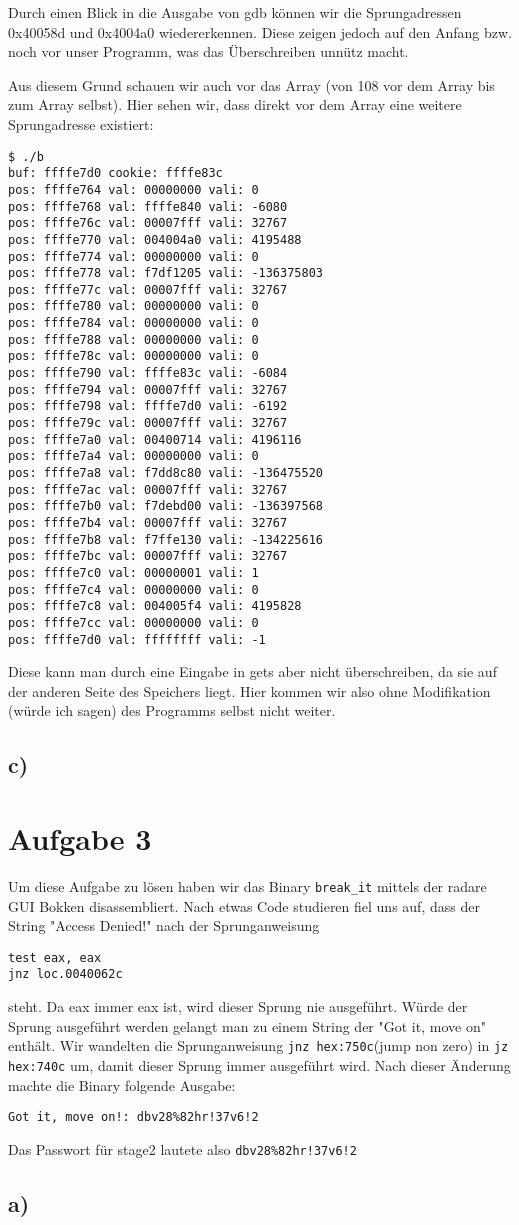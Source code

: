 \documentclass[10pt,a4paper]{article}
\begin{document}
Durch einen Blick in die Ausgabe von gdb können wir die Sprungadressen 0x40058d und 0x4004a0 wiedererkennen. Diese zeigen jedoch auf den Anfang bzw. noch vor unser Programm, was das Überschreiben unnütz macht.

Aus diesem Grund schauen wir auch vor das Array (von 108 vor dem Array bis zum Array selbst). Hier sehen wir, dass direkt vor dem Array eine weitere Sprungadresse existiert:
\begin{verbatim}
$ ./b
buf: ffffe7d0 cookie: ffffe83c
pos: ffffe764 val: 00000000 vali: 0
pos: ffffe768 val: ffffe840 vali: -6080
pos: ffffe76c val: 00007fff vali: 32767
pos: ffffe770 val: 004004a0 vali: 4195488
pos: ffffe774 val: 00000000 vali: 0
pos: ffffe778 val: f7df1205 vali: -136375803
pos: ffffe77c val: 00007fff vali: 32767
pos: ffffe780 val: 00000000 vali: 0
pos: ffffe784 val: 00000000 vali: 0
pos: ffffe788 val: 00000000 vali: 0
pos: ffffe78c val: 00000000 vali: 0
pos: ffffe790 val: ffffe83c vali: -6084
pos: ffffe794 val: 00007fff vali: 32767
pos: ffffe798 val: ffffe7d0 vali: -6192
pos: ffffe79c val: 00007fff vali: 32767
pos: ffffe7a0 val: 00400714 vali: 4196116
pos: ffffe7a4 val: 00000000 vali: 0
pos: ffffe7a8 val: f7dd8c80 vali: -136475520
pos: ffffe7ac val: 00007fff vali: 32767
pos: ffffe7b0 val: f7debd00 vali: -136397568
pos: ffffe7b4 val: 00007fff vali: 32767
pos: ffffe7b8 val: f7ffe130 vali: -134225616
pos: ffffe7bc val: 00007fff vali: 32767
pos: ffffe7c0 val: 00000001 vali: 1
pos: ffffe7c4 val: 00000000 vali: 0
pos: ffffe7c8 val: 004005f4 vali: 4195828
pos: ffffe7cc val: 00000000 vali: 0
pos: ffffe7d0 val: ffffffff vali: -1
\end{verbatim}
Diese kann man durch eine Eingabe in gets aber nicht überschreiben, da sie auf der anderen Seite des Speichers liegt. Hier kommen wir also ohne Modifikation (würde ich sagen) des Programms selbst nicht weiter.

\subsection*{c)}
\section*{Aufgabe 3}
Um diese Aufgabe zu lösen haben wir das Binary \texttt{break\_it} mittels der radare GUI Bokken disassembliert. Nach etwas Code studieren fiel uns auf, dass der String "Access Denied!" nach der Sprunganweisung 
\begin{verbatim}
test eax, eax
jnz loc.0040062c
\end{verbatim}  
steht. Da eax immer eax ist, wird dieser Sprung nie ausgeführt. Würde der Sprung ausgeführt werden gelangt man zu einem String der "Got it, move on" enthält. Wir wandelten die Sprunganweisung \texttt{jnz hex:750c}(jump non zero) in \texttt{jz hex:740c} um, damit dieser Sprung immer ausgeführt wird.
Nach dieser Änderung machte die Binary folgende Ausgabe:
\begin{verbatim}
Got it, move on!: dbv28%82hr!37v6!2
\end{verbatim}
Das Passwort für stage2 lautete also \texttt{dbv28\%82hr!37v6!2}

\subsection*{a)}
\end{document}

